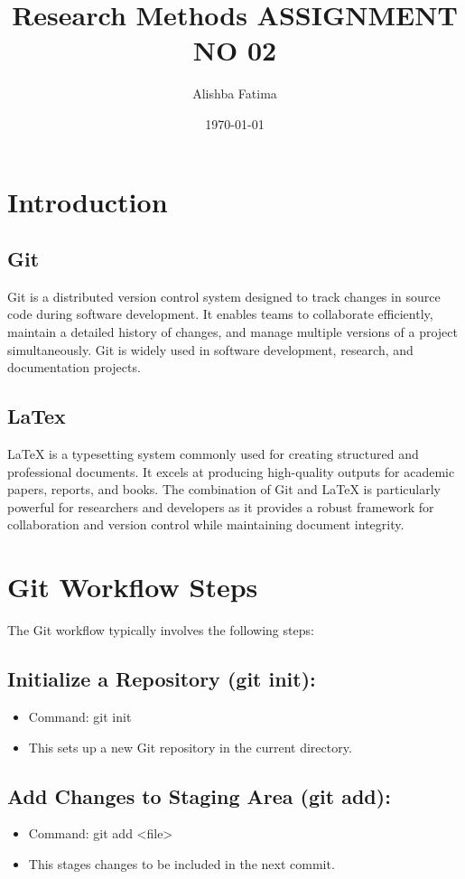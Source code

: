 \documentclass{article}
\title{Research Methods ASSIGNMENT NO 02 }
\author{Alishba Fatima}
\date{\today}
\begin{document}
\maketitle

\section{Introduction}
\subsection{Git}
Git is a distributed version control system designed to track changes in source code during software development. It enables teams to collaborate efficiently, maintain a detailed history of changes, and manage multiple versions of a project simultaneously. Git is widely used in software development, research, and documentation projects.
\subsection{LaTex}
LaTeX is a typesetting system commonly used for creating structured and professional documents. It excels at producing high-quality outputs for academic papers, reports, and books. The combination of Git and LaTeX is particularly powerful for researchers and developers as it provides a robust framework for collaboration and version control while maintaining document integrity.


\section{Git Workflow Steps}
The Git workflow typically involves the following steps:
\subsection{Initialize a Repository (git init):}
\begin{itemize}
    \item Command: git init
\item This sets up a new Git repository in the current directory.
\end{itemize}

\subsection{Add Changes to Staging Area (git add):}
\begin{itemize}
    \item Command: git add <file>
\item This stages changes to be included in the next commit.
\end{itemize}
\end{document}
